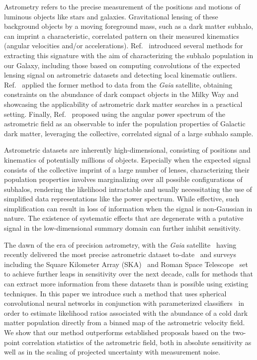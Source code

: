 \documentclass[preprint]{article}
\begin{document}
Astrometry refers to the precise measurement of the positions and motions of luminous objects like stars and galaxies. Gravitational lensing of these background objects by a moving foreground mass, such as a dark matter subhalo, can imprint a characteristic, correlated pattern on their measured kinematics (angular velocities and/or accelerations). Ref.~\cite{VanTilburg:2018ykj} introduced several methods for extracting this signature with the aim of characterizing the subhalo population in our Galaxy, including those based on computing convolutions of the expected lensing signal on astrometric datasets and detecting local kinematic outliers. Ref.~\cite{Mondino:2020rkn} applied the former method to data from the \emph{Gaia} satellite, obtaining constraints on the abundance of dark compact objects in the Milky Way and showcasing the applicability of astrometric dark matter searches in a practical setting. Finally, Ref.~\cite{Mishra-Sharma:2020ynk} proposed using the angular power spectrum of the astrometric field as an observable to infer the population properties of Galactic dark matter, leveraging the collective, correlated signal of a large subhalo sample. 

Astrometric datasets are inherently high-dimensional, consisting of positions and kinematics of potentially millions of objects. Especially when the expected signal consists of the collective imprint of a large number of lenses, characterizing their population properties involves marginalizing over all possible configurations of subhalos, rendering the likelihood intractable and usually necessitating the use of simplified data representations like the power spectrum. While effective, such simplification can result in loss of information when the signal is non-Gaussian in nature. The existence of systematic effects that are degenerate with a putative signal in the low-dimensional summary domain can further inhibit sensitivity. 

The dawn of the era of precision astrometry, with the \emph{Gaia} satellite~\cite{2016A&A...595A...1G} having recently delivered the most precise astrometric dataset to-date~\cite{2018A&A...616A...1G,2018A&A...616A...2L,2021A&A...649A...1G} and surveys including the Square Kilometer Array (SKA)~\cite{Fomalont:2004hr,Jarvis:2015tqa} and Roman Space Telescope~\cite{2019JATIS...5d4005W} set to achieve further leaps in sensitivity over the next decade, calls for methods that can extract more information from these datasets than is possible using existing techniques. In this paper we introduce such a method that uses spherical convolutional neural networks in conjunction with parameterized classifiers~\cite{Cranmer:2015bka,Baldi:2016fzo} in order to estimate likelihood ratios associated with the abundance of a cold dark matter population directly from a binned map of the astrometric velocity field. 
We show that our method outperforms established proposals based on the two-point correlation statistics of the astrometric field, both in absolute sensitivity as well as in the scaling of projected uncertainty with measurement noise.
\end{document}
